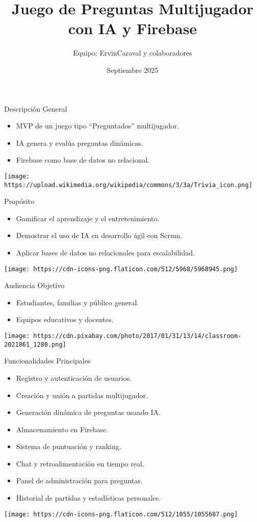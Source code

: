 \documentclass{beamer}
\title{Juego de Preguntas Multijugador con IA y Firebase}
\author{Equipo: ErvinCaraval y colaboradores}
\date{Septiembre 2025}
\begin{document}
\begin{frame}
  \titlepage
\end{frame}

\begin{frame}{Descripción General}
  \begin{itemize}
    \item MVP de un juego tipo “Preguntados” multijugador.
    \item IA genera y evalúa preguntas dinámicas.
    \item Firebase como base de datos no relacional.
  \end{itemize}
  \texttt{[image: https://upload.wikimedia.org/wikipedia/commons/3/3a/Trivia\_icon.png]}
\end{frame}

\begin{frame}{Propósito}
  \begin{itemize}
    \item Gamificar el aprendizaje y el entretenimiento.
    \item Demostrar el uso de IA en desarrollo ágil con Scrum.
    \item Aplicar bases de datos no relacionales para escalabilidad.
  \end{itemize}
  \texttt{[image: https://cdn-icons-png.flaticon.com/512/5968/5968945.png]}
\end{frame}

\begin{frame}{Audiencia Objetivo}
  \begin{itemize}
    \item Estudiantes, familias y público general.
    \item Equipos educativos y docentes.
  \end{itemize}
  \texttt{[image: https://cdn.pixabay.com/photo/2017/01/31/13/14/classroom-2021861\_1280.png]}
\end{frame}

\begin{frame}{Funcionalidades Principales}
  \begin{itemize}
    \item Registro y autenticación de usuarios.
    \item Creación y unión a partidas multijugador.
    \item Generación dinámica de preguntas usando IA.
    \item Almacenamiento en Firebase.
    \item Sistema de puntuación y ranking.
    \item Chat y retroalimentación en tiempo real.
    \item Panel de administración para preguntas.
    \item Historial de partidas y estadísticas personales.
  \end{itemize}
  \texttt{[image: https://cdn-icons-png.flaticon.com/512/1055/1055687.png]}
\end{frame}
\end{document}
